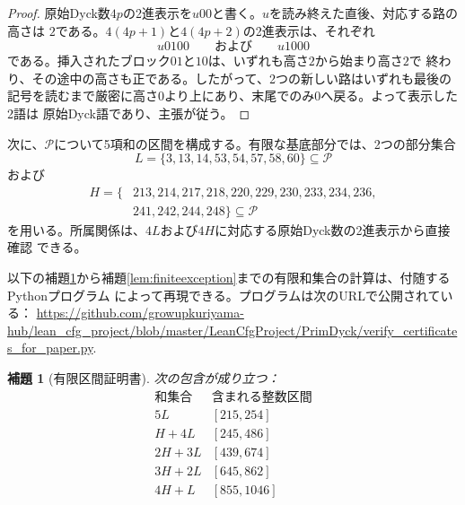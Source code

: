 \documentclass[12pt]{ltjsarticle}
\theoremstyle{plain}
\newtheorem{lemma}[theorem]{補題}
\newcommand{\Pset}{\mathcal P}
\begin{document}
\begin{proof}
原始Dyck数$4p$の2進表示を$u00$と書く。$u$を読み終えた直後、対応する路の高さは
$2$である。$4(4p+1)$と$4(4p+2)$の2進表示は、それぞれ
\[
 u0100\qquad\text{および}\qquad u1000
\]
である。挿入されたブロック$01$と$10$は、いずれも高さ$2$から始まり高さ$2$で
終わり、その途中の高さも正である。したがって、2つの新しい路はいずれも最後の
記号を読むまで厳密に高さ0より上にあり、末尾でのみ0へ戻る。よって表示した2語は
原始Dyck語であり、主張が従う。
\end{proof}

次に、$\Pset$について5項和の区間を構成する。有限な基底部分では、2つの部分集合
\[
 L=\{3,13,14,53,54,57,58,60\}\subseteq\Pset
\]
および
\[
\begin{split}
 H=\{&213,214,217,218,220,229,230,233,234,236,\\
     &241,242,244,248\}\subseteq\Pset
\end{split}
\]
を用いる。所属関係は、$4L$および$4H$に対応する原始Dyck数の2進表示から直接確認
できる。

以下の補題\ref{lem:finitefive}から補題\ref{lem:finiteexception}までの有限和集合の計算は、付随するPythonプログラム
によって再現できる。プログラムは次のURLで公開されている：
\url{https://github.com/growupkuriyama-hub/lean_cfg_project/blob/master/LeanCfgProject/PrimDyck/verify_certificates_for_paper.py}.


\begin{lemma}[有限区間証明書]\label{lem:finitefive}
次の包含が成り立つ：
\[
\begin{array}{c|c}
\text{和集合}&\text{含まれる整数区間}\\ \hline
5L &[215,254]\\
H+4L &[245,486]\\
2H+3L &[439,674]\\
3H+2L &[645,862]\\
4H+L &[855,1046]
\end{array}
\]
\end{lemma}
\end{document}
